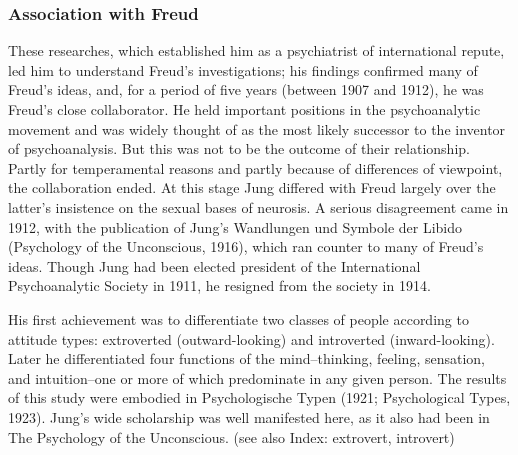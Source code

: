 \documentclass[12pt]{article}
\begin{document}
\subsubsection{Association with Freud}
These researches, which established him as a psychiatrist of
                                      international repute, led him to understand Freud's investigations; his
                                      findings confirmed many of Freud's ideas, and, for a period of five
                                      years (between 1907 and 1912), he was Freud's close collaborator. He
                                      held important positions in the psychoanalytic movement and was
                                      widely thought of as the most likely successor to the inventor of
                                      psychoanalysis. But this was not to be the outcome of their
                                      relationship. Partly for temperamental reasons and partly because of
                                      differences of viewpoint, the collaboration ended. At this stage Jung
                                      differed with Freud largely over the latter's insistence on the sexual
                                      bases of neurosis. A serious disagreement came in 1912, with the
                                      publication of Jung's Wandlungen und Symbole der Libido
                                      (Psychology of the Unconscious, 1916), which ran counter to many
                                      of Freud's ideas. Though Jung had been elected president of the
                                      International Psychoanalytic Society in 1911, he resigned from the
                                      society in 1914. 




                                      His first achievement was to differentiate two classes of people
                                      according to attitude types: extroverted (outward-looking) and
                                      introverted (inward-looking). Later he differentiated four functions
                                      of the mind--thinking, feeling, sensation, and intuition--one or more
                                      of which predominate in any given person. The results of this study
                                      were embodied in Psychologische Typen (1921; Psychological
                                      Types, 1923). Jung's wide scholarship was well manifested here, as
                                      it also had been in The Psychology of the Unconscious. (see also
                                      Index: extrovert, introvert) 
\end{document}
